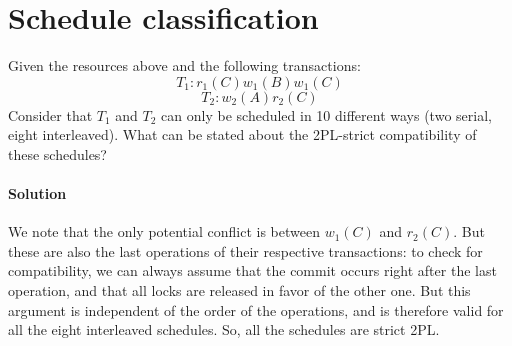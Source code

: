 \section{Schedule classification}

Given the resources above and the following transactions:
\[T_1: r_1(C) w_1(B) w_1(C)\] 
\[T_2: w_2(A) r_2(C)\]
Consider that $T_1$ and $T_2$ can only be scheduled in 10 different ways (two serial, eight interleaved). What can be stated about 
the 2PL-strict compatibility of these schedules? 

\paragraph*{Solution}
We note that the only potential conflict is between $w_1(C)$ and $r_2(C)$. But these are also the last operations of their respective 
transactions: to check for compatibility, we can always assume that the commit occurs right after the last operation, and that all 
locks are released in favor of the other one. But this argument is independent of the order of the operations, and is therefore valid 
for all the eight interleaved schedules. So, all the schedules are strict 2PL. 